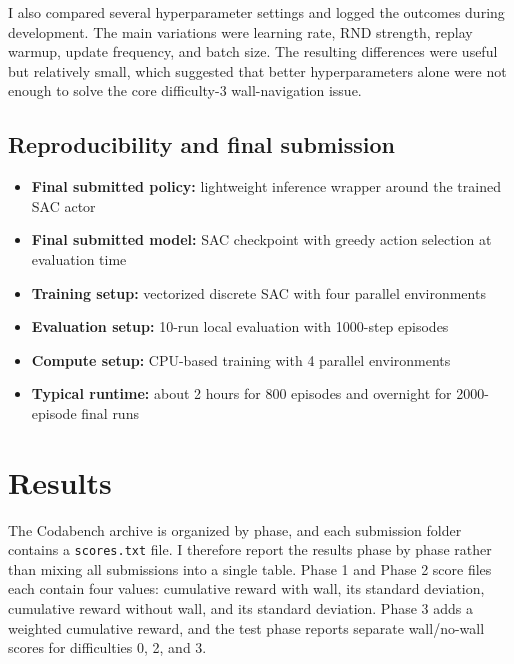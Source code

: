 \documentclass[11pt,oneside]{article}
\begin{document}
I also compared several hyperparameter settings and logged the outcomes during development. The main variations were learning rate, RND strength, replay warmup, update frequency, and batch size. The resulting differences were useful but relatively small, which suggested that better hyperparameters alone were not enough to solve the core difficulty-3 wall-navigation issue.

\subsection*{Reproducibility and final submission}
\begin{itemize}[leftmargin=*]
\item \textbf{Final submitted policy:} lightweight inference wrapper around the trained SAC actor
\item \textbf{Final submitted model:} SAC checkpoint with greedy action selection at evaluation time
\item \textbf{Training setup:} vectorized discrete SAC with four parallel environments
\item \textbf{Evaluation setup:} 10-run local evaluation with 1000-step episodes
\item \textbf{Compute setup:} CPU-based training with 4 parallel environments
\item \textbf{Typical runtime:} about 2 hours for 800 episodes and overnight for 2000-episode final runs
\end{itemize}

\section{Results}
The Codabench archive is organized by phase, and each submission folder contains a \texttt{scores.txt} file. I therefore report the results phase by phase rather than mixing all submissions into a single table. Phase 1 and Phase 2 score files each contain four values: cumulative reward with wall, its standard deviation, cumulative reward without wall, and its standard deviation. Phase 3 adds a weighted cumulative reward, and the test phase reports separate wall/no-wall scores for difficulties 0, 2, and 3.
\end{document}
